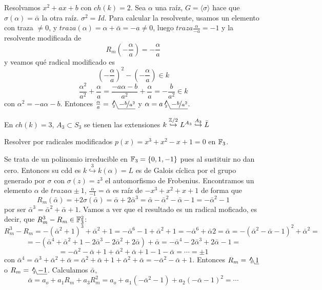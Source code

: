 \begin{ejem} Resolvamos $x^2+ax+b$ con $ch(k)=2$. Sea $\alpha$ una ra\'iz, $G = \langle \sigma\rangle$ hace que $\sigma(\alpha) = \bar \alpha$ la otra ra\'iz. $\sigma^2=Id$. Para calcular la resolvente, usamos un elemento con traza $\neq 0$, y $traza(\alpha) = \alpha+\bar \alpha= -a \neq 0$, luego $traza \frac{\alpha}{-a}=-1$ y la resolvente modificada de 
$$R_m \left( -\frac{\alpha}{a} \right) = - \frac{\alpha}{a} $$
y veamos qu\'e radical modificado es 
$$\left( -\frac{\alpha}{a} \right)^2 - \left( -\frac{\alpha}{a} \right) \in k$$
$$\frac{\alpha^2}{a^2} + \frac{\alpha}{a} = \frac{-a\alpha - b}{a^2} + \frac{\alpha}{a} = -\frac{b}{a^2} \in k$$
con $\alpha^2=-a\alpha-b$. Entonces $\frac{\alpha}{a} = \usqrt[2]{-\nicefrac{b}{a^2}}$ y $\alpha = a \usqrt[2]{-\nicefrac{b}{a^2}}$.  
\end{ejem}
\begin{ejem}
    En $ch(k)=3$, $A_3 \subset S_3$ se tienen las extensiones $k \overset{\mathbb{Z}/2}{\hookrightarrow} L^{A_3} \overset{A_3}{\hookrightarrow} \bar L$
\end{ejem}
\begin{ejer}
    Resolver por radicales modificados $p(x)= x^3+x^2-x+1=0$ en $\mathbb{F}_3$. 
\end{ejer}
\begin{dem}
    Se trata de un polinomio irreducible en $\mathbb{F}_3=\{0,1,-1\}$ pues al sustituir no dan cero. Entonces su cdd es $k \overset{3}{\hookrightarrow} k(\alpha) = L$ es de Galois c\'iclica por el grupo generado por $\sigma$ con $\sigma(z) = z^3$ el automorfismo de Frobenius. Encontramos un elemento $\alpha$ de $traza \alpha \pm 1$, $\frac{\alpha}{-1} = \bar \alpha$ es ra\'iz de $-x^3+x^2+x+1$ de forma que 
    $$R_m(\bar \alpha) =  + 2\sigma(\bar \alpha) = \bar \alpha + 2\bar \alpha^3 = \bar \alpha - \bar \alpha^2 - \bar \alpha - 1=-\bar \alpha^2-1$$
    por ser $\bar \alpha^3 = \bar \alpha^2+\bar \alpha+1$. Vamos a ver que el resultado es un radical moficado, es decir, que $R_m^3- R_m \in \mathbb{F}_3^2$:
    $$R_m^3- R_m = -(\bar \alpha^2+1)^3 + \bar \alpha^2 + 1  = -\bar \alpha^6-1+\bar \alpha^2+1 = -\bar \alpha^6 + \bar \alpha2 =\bar \alpha = - (\bar \alpha^2 -\bar \alpha-1)^2 +\bar \alpha^2 =$$
    $$= - (\bar \alpha^4 + \bar \alpha^2+1-2\bar \alpha^3 - 2\bar \alpha^2+2\bar \alpha)+ \bar \alpha = -\bar \alpha^4 - 2\bar \alpha^3 +2\bar \alpha-1 = $$
    $$ = -\bar \alpha^2 - \bar \alpha+1 +\bar \alpha^2+\bar \alpha+1 -1-\bar \alpha = \cdots = \pm 1$$
    con $\bar \alpha^4 = \bar \alpha^3+\bar \alpha^2+\bar \alpha = \bar \alpha^2 + \bar \alpha+1+\bar \alpha^2+\bar \alpha=-\bar \alpha^2-\bar \alpha+1$. Entonces $R_m= \usqrt[3]{1}$ o $R_m= \usqrt[3]{-1}$. Calculamos $\bar \alpha$, 
    $$\bar \alpha=a_o + a_1 R_m + a_3 R_m^2 = a_o + a_1 (-\bar \alpha^2-1) + a_2 (-\bar \alpha - 1)^2 = \cdots $$
\end{dem}
